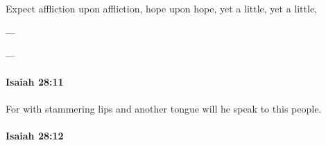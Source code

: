 \begin{framed}
\begin{compactdesc}
					\item[NETS] Expect affliction upon affliction, hope upon hope, yet a little, yet a little,
					\item[OTR1] ---
					\item[OTR2] ---
				\end{compactdesc}
			\end{framed}

		\paragraph{Isaiah 28:11} %
			\label{ISAIAH-28-11}

			For with stammering lips and another tongue will he speak to this people.


		\paragraph{Isaiah 28:12} %
			\label{ISAIAH-28-12}

